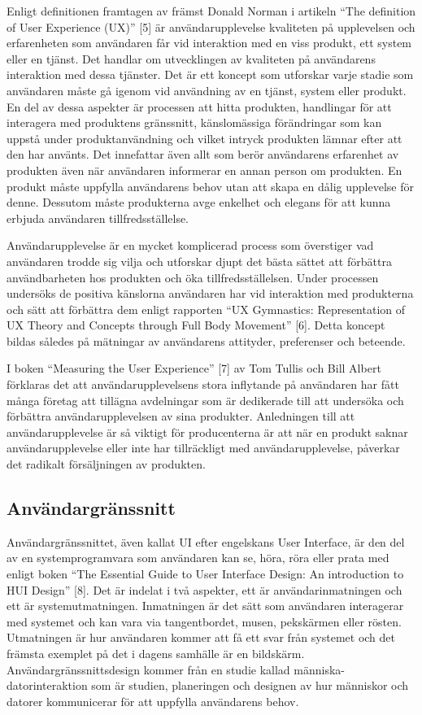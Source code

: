 \documentclass[12pt]{kththesis}
\begin{document}
Enligt definitionen framtagen av främst Donald Norman i artikeln “The definition of User Experience (UX)” [5] är användarupplevelse kvaliteten på upplevelsen och erfarenheten som användaren får vid interaktion med en viss produkt, ett system eller en tjänst. Det handlar om utvecklingen av kvaliteten på användarens interaktion med dessa tjänster. Det är ett koncept som utforskar varje stadie som användaren måste gå igenom vid användning av en tjänst, system eller produkt. En del av dessa aspekter är processen att hitta produkten, handlingar för att interagera med produktens gränssnitt, känslomässiga förändringar som kan uppstå under produktanvändning och vilket intryck produkten lämnar efter att den har använts. Det innefattar även allt som berör användarens erfarenhet av produkten även när användaren informerar en annan person om produkten. En produkt måste uppfylla användarens behov utan att skapa en dålig upplevelse för denne. Dessutom måste produkterna avge enkelhet och elegans för att kunna erbjuda användaren tillfredsställelse. 

Användarupplevelse är en mycket komplicerad process som överstiger vad användaren trodde sig vilja och utforskar djupt det bästa sättet att förbättra användbarheten hos produkten och öka tillfredsställelsen. Under processen undersöks de positiva känslorna användaren har vid interaktion med produkterna och sätt att förbättra dem enligt rapporten “UX Gymnastics: Representation of UX Theory and Concepts through Full Body Movement” [6]. Detta koncept bildas således på mätningar av användarens attityder, preferenser och beteende. 

I boken “Measuring the User Experience” [7] av Tom Tullis och Bill Albert förklaras det att användarupplevelsens stora inflytande på användaren har fått många företag att tillägna avdelningar som är dedikerade till att undersöka och förbättra användarupplevelsen av sina produkter. Anledningen till att användarupplevelse är så viktigt för producenterna är att när en produkt saknar användarupplevelse eller inte har tillräckligt med användarupplevelse, påverkar det radikalt försäljningen av produkten. 

\subsection{Användargränssnitt}
Användargränssnittet, även kallat UI efter engelskans User Interface, är den del av en systemprogramvara som användaren kan se, höra, röra eller prata med enligt boken “The Essential Guide to User Interface Design: An introduction to HUI Design” [8]. Det är indelat i två aspekter, ett är användarinmatningen och ett är systemutmatningen. Inmatningen är det sätt som användaren interagerar med systemet och kan vara via tangentbordet, musen, pekskärmen eller rösten. Utmatningen är hur användaren kommer att få ett svar från systemet och det främsta exemplet på det i dagens samhälle är en bildskärm. Användargränssnittsdesign kommer från en studie kallad människa-datorinteraktion som är studien, planeringen och designen av hur människor och datorer kommunicerar för att uppfylla användarens behov.
\end{document}
